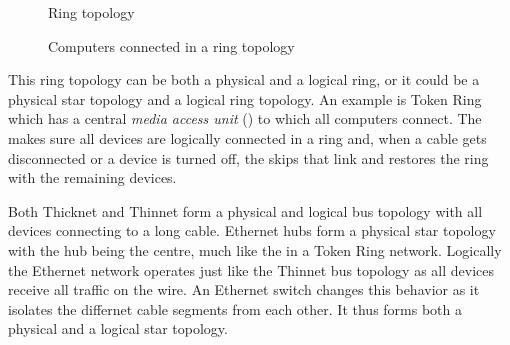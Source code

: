 \begin{figure}
   \centering
   Ring topology
   \caption{Computers connected in a ring topology}
   \label{fig:intro-topo-ring}
\end{figure}


This ring topology can be both a physical and a logical ring, or it could be a physical star topology and a logical ring topology.
An example is Token Ring which has a central \emph{media access unit} () to which all computers connect.
The  makes sure all devices are logically connected in a ring and, when a cable gets disconnected or a device is turned off, the  skips that link and restores the ring with the remaining devices.

Both Thicknet and Thinnet form a physical and logical bus topology with all devices connecting to a long cable.
Ethernet hubs form a physical star topology with the hub being the centre, much like the  in a Token Ring network.
Logically the Ethernet network operates just like the Thinnet bus topology as all devices receive all traffic on the wire.
An Ethernet switch changes this behavior as it isolates the differnet cable segments from each other.
It thus forms both a physical and a logical star topology.





